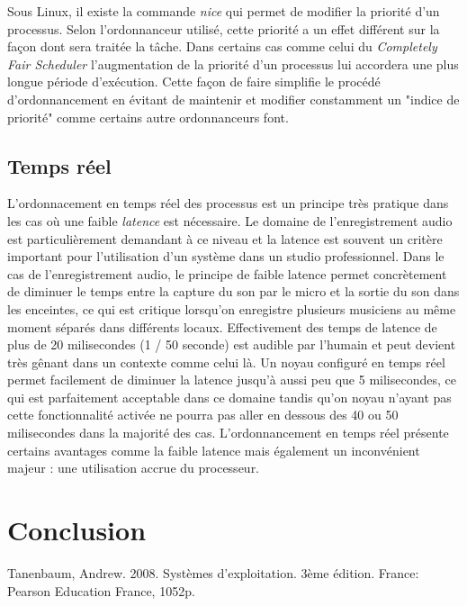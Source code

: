 \documentclass{article}
\begin{document}
\newline
\newline

Sous Linux, il existe la commande \emph{nice} qui permet de modifier la priorité d'un processus. Selon l'ordonnanceur utilisé, cette priorité a un effet différent sur la façon dont sera traitée la tâche. Dans certains cas comme celui du \emph{Completely Fair Scheduler} l'augmentation de la priorité d'un processus lui accordera une plus longue période d'exécution. Cette façon de faire simplifie le procédé d'ordonnancement en évitant de maintenir et modifier constamment un "indice de priorité" comme certains autre ordonnanceurs font.


\subsection{Temps réel}

L'ordonnacement en temps réel des processus est un principe très pratique dans les cas où une faible \emph{latence} est nécessaire. Le domaine de l'enregistrement audio est particulièrement demandant à ce niveau et la latence est souvent un critère important pour l'utilisation d'un système dans un studio professionnel.
\newline
\newline
Dans le cas de l'enregistrement audio, le principe de faible latence permet concrètement de diminuer le temps entre la capture du son par le micro et la sortie du son dans les enceintes, ce qui est critique lorsqu'on enregistre plusieurs musiciens au même moment séparés dans différents locaux. Effectivement des temps de latence de plus de 20 milisecondes (1 / 50 seconde) est audible par l'humain et peut devient très gênant dans un contexte comme celui là. Un noyau configuré en temps réel permet facilement de diminuer la latence jusqu'à aussi peu que 5 milisecondes, ce qui est parfaitement acceptable dans ce domaine tandis qu'on noyau n'ayant pas cette fonctionnalité activée ne pourra pas aller en dessous des 40 ou 50 milisecondes dans la majorité des cas. 
\newline
\newline
 L'ordonnancement en temps réel présente certains avantages comme la faible latence mais également un inconvénient majeur : une utilisation accrue du processeur.
 


\section{Conclusion}

\begin{thebibliography}{9}
Tanenbaum, Andrew. 2008. Systèmes d'exploitation. 3ème édition. France: Pearson Education France, 1052p.
\end{thebibliography}
\end{document}
